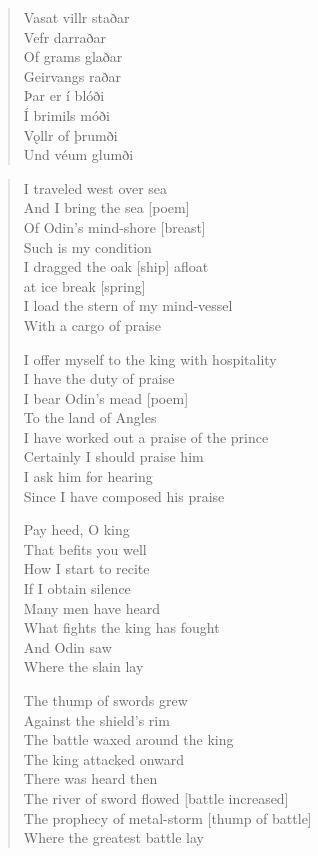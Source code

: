 \begin{paracol}{2}
\begin{quote}
    Vasat villr staðar\\
    Vefr darraðar\\
    Of grams glaðar\\
    Geirvangs raðar\\
    Þar er í blóði\\
    Í brimils móði\\
    Vǫllr of þrumði\\
    Und véum glumði
  \end{quote}
  \switchcolumn
  \begin{quote}
    I traveled west over sea\\
    And I bring the sea [poem]\\
    Of Odin's mind-shore [breast] \\
    Such is my condition\\
    I dragged the oak [ship] afloat\\
    at ice break [spring]\\
    I load the stern of my mind-vessel\\
    With a cargo of praise

    I offer myself to the king with hospitality\\
    I have the duty of praise\\
    I bear Odin's mead [poem]\\
    To the land of Angles\\
    I have worked out a praise of the prince\\
    Certainly I should praise him\\
    I ask him for hearing\\
    Since I have composed his praise

    Pay heed, O king\\
    That befits you well\\
    How I start to recite\\
    If I obtain silence\\
    Many men have heard \\
    What fights the king has fought\\
    And Odin saw\\
    Where the slain lay

    The thump of swords grew\\
    Against the shield's rim\\
    The battle waxed around the king\\
    The king attacked onward\\
    There was heard then\\
    The river of sword flowed [battle increased]\\
    The prophecy of metal-storm [thump of battle]\\
    Where the greatest battle lay


\end{quote}
\end{paracol}
